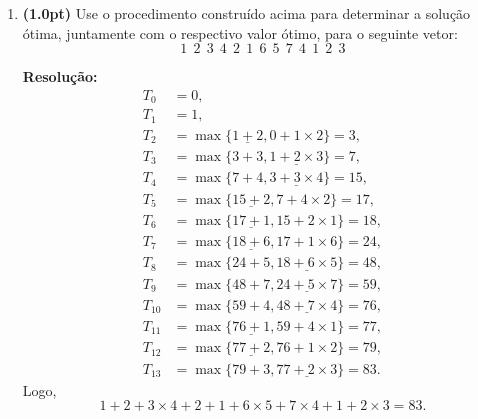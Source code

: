 \documentclass{article}
\begin{document}
\begin{enumerate}[resume*=exerc]
\begin{enumerate}[label=(\alph*),series=q6]
    \item {\bf (1.0pt)} Use o procedimento construído acima para determinar a solução ótima, juntamente com o respectivo valor ótimo, para o seguinte vetor:
        \[
        1~~2~~3~~4~~2~~1~~6~~5~~7~~4~~1~~2~~3
        \]
    \begin{framed}
    {\bf Resolução:}
    \begin{align*}
        T_0 &= 0,\\
        T_1 &= 1,\\
        T_2 &= \max\big\{\underline{1+2},0+1\times 2\big\} = 3,\\
        T_3 &= \max\big\{3+3,\underline{1+2\times 3}\big\}= 7,\\
        T_4 &= \max\big\{7+4,\underline{3+3\times 4}\big\}= 15,\\
        T_5 &= \max\big\{\underline{15+2},7+4\times 2\big\}= 17,\\
        T_6 &= \max\big\{\underline{17+1},15+2\times 1\big\}= 18,\\
        T_7 &= \max\big\{\underline{18+6},17+1\times 6\big\}= 24,\\
        T_8 &= \max\big\{24+5,\underline{18+6\times 5}\big\}= 48,\\
        T_9 &= \max\big\{48+7,\underline{24+5\times 7}\big\}= 59,\\
        T_{10} &= \max\big\{59+4,\underline{48+7\times 4}\big\}= 76,\\
        T_{11} &= \max\big\{\underline{76+1},59+4\times 1\big\}= 77,\\
        T_{12} &= \max\big\{\underline{77+2},76+1\times 2\big\}= 79,\\
        T_{13} &= \max\big\{79+3,\underline{77+2\times 3}\big\}= 83.
    \end{align*}
    Logo,
    \[
    1+2+3\times4+2+1+6\times5+7\times4+ 1+ 2\times 3 = 83.
    \]
    \vspace{11cm}
    \end{framed}
\end{enumerate}
\end{enumerate}

\pagebreak
\end{document}
